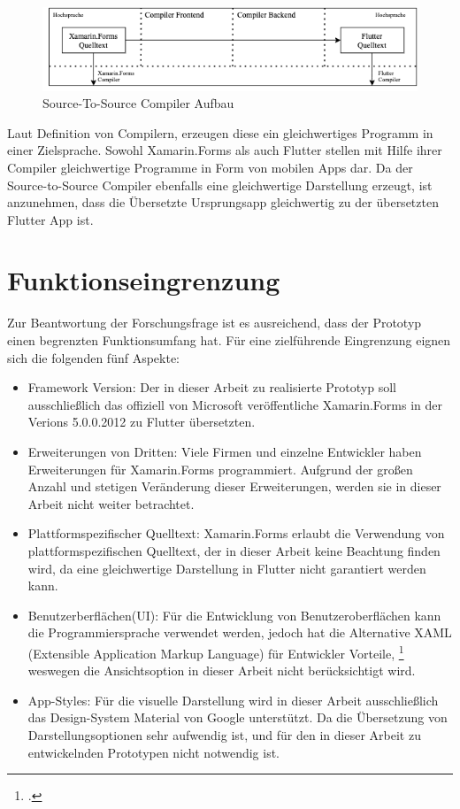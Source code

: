 \begin{figure}[!ht]
 \includegraphics[width=\textwidth,keepaspectratio]{Images/CompilerArchitecture/S2SArchitecture.png}
 \caption{Source-To-Source Compiler Aufbau}
 \label{fig:S2SCompilerAufbau}
\end{figure}

Laut Definition von Compilern,  erzeugen diese ein gleichwertiges Programm in einer Zielsprache.  Sowohl Xamarin.Forms als auch Flutter stellen mit Hilfe ihrer Compiler gleichwertige Programme in Form von mobilen Apps dar.  Da der Source-to-Source Compiler ebenfalls eine gleichwertige Darstellung erzeugt, ist anzunehmen, dass die Übersetzte Ursprungsapp gleichwertig zu der übersetzten Flutter App ist. 

\section{Funktionseingrenzung}
Zur Beantwortung der Forschungsfrage ist es ausreichend, dass der Prototyp einen begrenzten Funktionsumfang hat.  Für eine zielführende Eingrenzung eignen sich die folgenden fünf Aspekte:

\begin{itemize}
\setlength\itemsep{-0.6em}
 \item Framework Version: Der in dieser Arbeit zu realisierte Prototyp soll ausschließlich das offiziell von Microsoft veröffentliche Xamarin.Forms in der Verions 5.0.0.2012 zu Flutter übersetzten.  
 \item Erweiterungen von Dritten: Viele Firmen und einzelne Entwickler haben Erweiterungen für Xamarin.Forms programmiert.  Aufgrund der großen Anzahl und stetigen Veränderung dieser Erweiterungen, werden sie in dieser Arbeit nicht weiter betrachtet.  
 \item Plattformspezifischer Quelltext: Xamarin.Forms erlaubt die Verwendung von plattformspezifischen Quelltext,  der in dieser Arbeit keine Beachtung finden wird, da eine gleichwertige Darstellung in Flutter nicht garantiert werden kann. 
  \item Benutzerberflächen(UI): Für die Entwicklung von Benutzeroberflächen kann die Programmiersprache \Csharp verwendet werden,  jedoch hat die Alternative XAML  (Extensible Application Markup Language) für Entwickler Vorteile, \footcite[Vgl.][Abgerufen am \today]{MicrosoftXAML2017} weswegen die \Csharp  Ansichtsoption in dieser Arbeit nicht berücksichtigt wird.  
  \item App-Styles: Für die visuelle Darstellung wird in dieser Arbeit ausschließlich das Design-System Material von Google unterstützt.  Da die Übersetzung von Darstellungsoptionen sehr aufwendig ist,  und für den in dieser Arbeit zu entwickelnden Prototypen nicht notwendig ist.  
\end{itemize}

